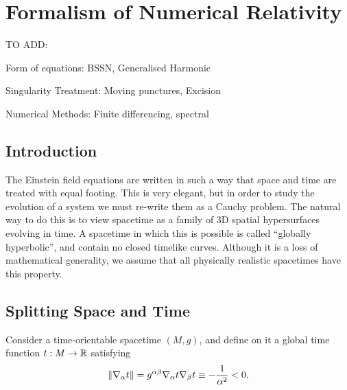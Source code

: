 %
%

\chapter{Formalism of Numerical Relativity}      

TO ADD:

Form of equations: BSSN, Generalised Harmonic

Singularity Treatment: Moving punctures, Excision

Numerical Methods: Finite differencing, spectral
     
\section{Introduction}     
The Einstein field equations are written in such a way that space and time are treated with equal footing. This is very elegant, but in order to study the evolution of a system we must re-write them as a Cauchy problem. The natural way to do this is to view spacetime as a family of 3D spatial hypersurfaces evolving in time. A spacetime in which this is possible is called ``globally hyperbolic'', and contain no closed timelike curves. Although it is a loss of mathematical generality, we assume that all physically realistic spacetimes have this property.

\section{Splitting Space and Time}
Consider a time-orientable spacetime $(M, g)$, and define on it a global time function $t:M \rightarrow {\mathbb R}$ satisfying
\begin{equation}\label{eq:gtf}
\| {\nabla}_\alpha t \|= g^{\alpha \beta}{\nabla}_\alpha t {\nabla}_\beta t \equiv -\frac{1}{\alpha^2} < 0.
\end{equation}

